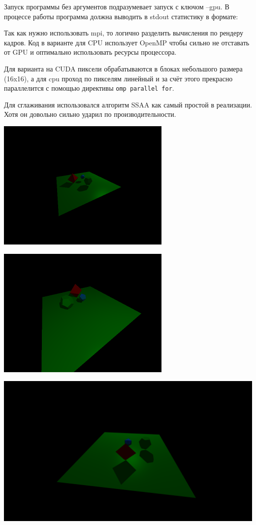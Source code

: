 \documentclass[12pt]{article}
\begin{document}
Запуск программы без аргументов подразумевает запуск с ключом --gpu.
В процессе работы программа должна выводить в stdout статистику в формате:

\nvidia


Так как нужно использовать mpi, то логично разделить вычисления по рендеру кадров.
Код в варианте для CPU использует OpenMP чтобы сильно не отставать от GPU и оптимально
использовать ресурсы процессора.

Для варианта на CUDA пиксели обрабатываются в блоках небольшого размера (16x16),
а для cpu проход по пикселям линейный и за счёт этого прекрасно параллелится с помощью директивы \lstinline|omp parallel for|.

Для сглаживания использовался алгоритм SSAA как самый простой в реализации.
Хотя он довольно сильно ударил по производительности.




\includegraphics{small.png}

\includegraphics{small_2.png}

\smallbreak

\includegraphics[scale=0.20]{11.data.png}

\end{document}
